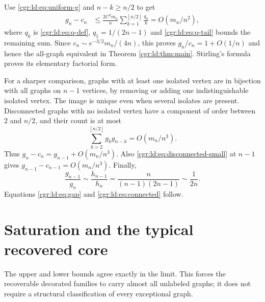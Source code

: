 \documentclass[11pt,letterpaper]{article}
\numberwithin{equation}{section}
\theoremstyle{definition}\newtheorem{definition}[theorem]{Definition}
\theoremstyle{remark}\newtheorem{remark}[theorem]{Remark}
\newcommand{\floor}[1]{\left\lfloor #1\right\rfloor}
\begin{document}
Use \eqref{cgr:ld:eq:uniform-g} and $n-k\ge n/2$ to get
\begin{align}
 g_n-c_n
 &\le\frac{2C^2m_n}{n}
       \sum_{k=1}^{\floor{n/2}}\frac{q_k}{k}
   =O(m_n/n^2),\label{cgr:ld:eq:disconnected-small}
\end{align}
where $q_k$ is \eqref{cgr:ld:eq:q-def}, $q_1=1/(2n-1)$ and
\eqref{cgr:ld:eq:q-tail} bounds the remaining sum. Since
$c_n\sim e^{-3/2}m_n/(4n)$, this proves
$g_n/c_n=1+O(1/n)$ and hence the all-graph equivalent in
Theorem \ref{cgr:ld:thm:main}. Stirling's formula proves its elementary
factorial form.

For a sharper comparison, graphs with at least one isolated vertex
are in bijection with all graphs on $n-1$ vertices, by removing
or adding one indistinguishable isolated vertex. The image is
unique even when several isolates are present. Disconnected
graphs with no isolated vertex have a component of order between
$2$ and $n/2$, and their count is at most
\begin{equation}\label{cgr:ld:eq:no-isolates}
 \sum_{k=2}^{\floor{n/2}}g_kg_{n-k}=O(m_n/n^3).
\end{equation}
Thus $g_n-c_n=g_{n-1}+O(m_n/n^3)$. Also
\eqref{cgr:ld:eq:disconnected-small} at $n-1$ gives
$g_{n-1}-c_{n-1}=O(m_n/n^3)$. Finally,
\begin{equation}\label{cgr:ld:eq:ratio-prev}
 \frac{g_{n-1}}{g_n}
 \sim\frac{h_{n-1}}{h_n}
 =\frac{n}{(n-1)(2n-1)}\sim\frac1{2n}.
\end{equation}
Equations \eqref{cgr:ld:eq:gap} and \eqref{cgr:ld:eq:connected} follow.

\section{Saturation and the typical recovered core}\label{cgr:ld:sec:saturation}
The upper and lower bounds agree exactly in the limit. This
forces the recoverable decorated families to carry almost all
unlabeled graphs; it does not require a structural classification
of every exceptional graph.
\end{document}
